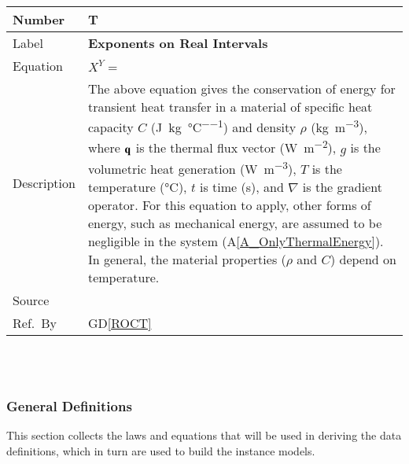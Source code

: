 \documentclass[12pt]{article}
\newcommand{\colAwidth}{0.13\textwidth}
\newcommand{\colBwidth}{0.82\textwidth}
\newcommand{\dref}[1]{GD\ref{#1}}
\newcounter{theorynum} %
\newcommand{\aref}[1]{A\ref{#1}}
\begin{document}
\noindent
\begin{minipage}{\textwidth}
	\renewcommand*{\arraystretch}{1.5}
	\begin{tabular}{| p{\colAwidth} | p{\colBwidth}|}
		\hline
		\rowcolor[gray]{0.9}
		Number& T{theorynum}\thetheorynum 
		\label{T_exponents}\\
		\hline
		Label&\bf Exponents on Real Intervals\\
		\hline
		Equation&  $X^Y = $\\
		\hline
		Description & 
		The above equation gives the conservation of energy for transient heat 
		transfer in a material
		of specific heat capacity $C$ (\si{\joule\per\kilogram\per\celsius}) 
		and density $\rho$ 
		(\si{\kilogram\per\cubic\metre}), where $\bf q$ is the thermal flux 
		vector (\si{\watt\per\square\metre}),
		$g$ is the volumetric heat generation
		(\si{\watt\per\cubic\metre}), $T$ is the temperature
		(\si{\celsius}),  $t$ is time (\si{\second}), and $\nabla$ is
		the gradient operator.  For this equation to apply, other forms
		of energy, such as mechanical energy, are assumed to be negligible in 
		the
		system (\aref{A_OnlyThermalEnergy}).  In general, the material 
		properties ($\rho$ and $C$) depend on temperature.\\
		\hline
		Source & \citet{intervalarithmetic}\\
		\hline
		Ref.\ By & \dref{ROCT}\\
		\hline
	\end{tabular}
\end{minipage}\\

~\newline

\subsubsection{General Definitions}\label{sec_gendef}

This section collects the laws and equations that will be used in deriving the
data definitions, which in turn are used to build the instance models.
  

~\newline
\end{document}
